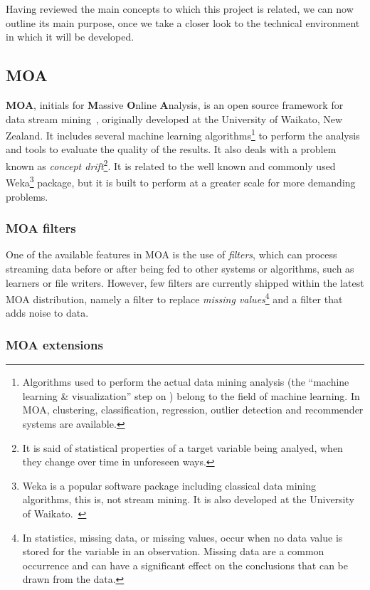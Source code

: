 Having reviewed the main concepts to which this project is related, we can now outline
its main purpose, once we take a closer look to the technical environment in which it
will be developed.

\subsection{MOA}
\label{Introduction::moa-ppsm::MOA}

\textbf{MOA}, initials for \textbf{M}assive \textbf{O}nline \textbf{A}nalysis, is an 
open source framework for data stream mining~\citep{web:MOA}, originally 
developed at the University of Waikato, New Zealand. It includes several machine learning 
algorithms\footnote{Algorithms used to perform the actual data mining analysis (the 
“machine learning \& visualization” step on ) belong to the 
field of machine learning. In MOA, clustering, classification, regression, outlier 
detection and recommender systems are available.} to perform the analysis and tools 
to evaluate the quality of the results. It also deals with a problem known as 
\textit{concept drift}\footnote{It is said of statistical properties of a target variable 
being analyed, when they change over time in unforeseen ways.}. It is related to the well
known and commonly used Weka\footnote{Weka is a popular software package including 
classical data mining algorithms, this is, not stream mining. It is also developed at 
the University of Waikato.~\citep{web:Weka}} package, but it is built to perform at 
a greater scale for more demanding problems.

\subsubsection{MOA filters}

One of the available features in MOA is the use of \textit{filters}, which can process
streaming data before or after being fed to other systems or algorithms, such as learners
or file writers. However, few filters are currently shipped within the latest MOA distribution,
namely a filter to replace \textit{missing values}\footnote{In statistics, missing data, or missing values, 
occur when no data value is stored for the variable in an observation. Missing data are a 
common occurrence and can have a significant effect on the conclusions that can be drawn 
from the data.} and a filter that adds noise to data.

\subsubsection{MOA extensions}

